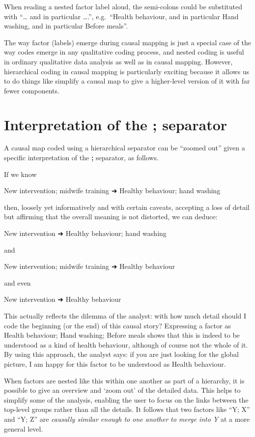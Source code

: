 \documentclass[
]{book}
\begin{document}
When reading a nested factor label aloud, the semi-colons could be substituted with ``\ldots{} and in particular \ldots.'', e.g.~``Health behaviour, and in particular Hand washing, and in particular Before meals''.

The way factor (labels) emerge during causal mapping is just a special case of the way codes emerge in any qualitative coding process, and nested coding is useful in ordinary qualitative data analysis as well as in causal mapping. However, hierarchical coding in causal mapping is particularly exciting because it allows us to do things like simplify a causal map to give a higher-level version of it with far fewer components.

\hypertarget{interpretation-of-the-separator}{%
\section{Interpretation of the ; separator}\label{interpretation-of-the-separator}}

A causal map coded using a hierarchical separator can be ``zoomed out'' given a specific interpretation of the \textbf{;} separator, as follows.

If we know

New intervention; midwife training ➜ Healthy behaviour; hand washing

then, loosely yet informatively and with certain caveats, accepting a loss of detail but affirming that the overall meaning is not distorted, we can deduce:

New intervention ➜ Healthy behaviour; hand washing

and

New intervention; midwife training ➜ Healthy behaviour

and even

New intervention ➜ Healthy behaviour

This actually reflects the dilemma of the analyst: with how much detail should I code the beginning (or the end) of this causal story? Expressing a factor as Health behaviour; Hand washing; Before meals shows that this is indeed to be understood as a kind of health behaviour, although of course not the whole of it. By using this approach, the analyst says: if you are just looking for the global picture, I am happy for this factor to be understood as Health behaviour.

When factors are nested like this within one another as part of a hierarchy, it is possible to give an overview and `zoom out' of the detailed data. This helps to simplify some of the analysis, enabling the user to focus on the links between the top-level groups rather than all the details. It follows that two factors like ``Y; X'' and ``Y; Z'' are \emph{causally similar enough to one another to merge into Y} at a more general level.
\end{document}
